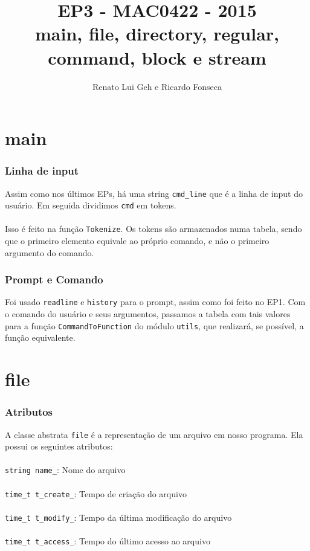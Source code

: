 \documentclass{beamer}
\title[EP3 - MAC0422]{EP3 - MAC0422 - 2015 \\
                      main, file, directory, regular, command, block e stream} %
\author{Renato Lui Geh e Ricardo Fonseca}
\date{}
\begin{document}
\begin{frame}
  \titlepage %
\end{frame}



\section{main} %

\begin{frame}
  \frametitle{Linha de input}
  Assim como nos últimos EPs, há uma string \texttt{cmd\_line} que é a linha de input do usuário. Em seguida dividimos \texttt{cmd} em tokens. \\~\\
  Isso é feito na função \texttt{Tokenize}. Os tokens são armazenados numa tabela, sendo que o primeiro elemento equivale ao próprio comando, e não o primeiro argumento do comando.
\end{frame}

\begin{frame}
  \frametitle{Prompt e Comando}
  Foi usado \texttt{readline} e \texttt{history} para o prompt, assim como foi feito no EP1.
  Com o comando do usuário e seus argumentos, passamos a tabela com tais valores para a função
  \texttt{CommandToFunction} do módulo \texttt{utils}, que realizará, se possível, a função equivalente. 
\end{frame}


\section{file}

\begin{frame}
  \frametitle{Atributos}
  A classe abstrata \texttt{file} é a representação de um arquivo em nosso programa. Ela possui os seguintes atributos:\\~\\
       \texttt{string name\_}: Nome do arquivo \\~\\
  \texttt{time\_t t\_create\_}: Tempo de criação do arquivo \\~\\
  \texttt{time\_t t\_modify\_}: Tempo da última modificação do arquivo \\~\\
  \texttt{time\_t t\_access\_}: Tempo do último acesso ao arquivo
  
  
\end{frame}
\end{document}
